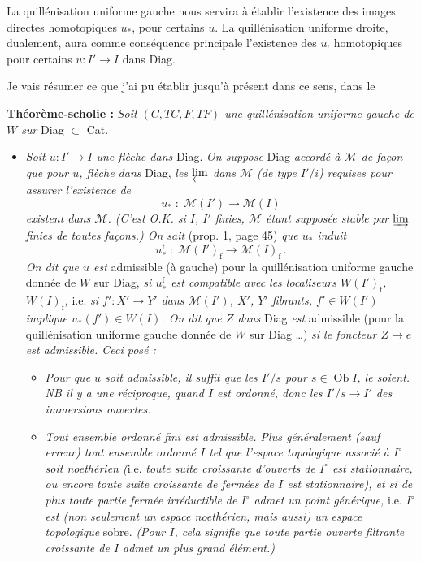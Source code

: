 \documentclass[11pt]{article}
\newcommand{\msp}[1]{\marginpar{\footnotesize [#1]}}
\begin{document}
La quillénisation uniforme gauche nous servira à établir l'existence des images directes homotopiques $u_{*}$, pour certains $u$. La quillénisation uniforme droite, dualement, aura comme conséquence principale l'existence des $u_{!}$ homotopiques pour certains $u : I' \longrightarrow I$ dans Diag.

Je vais résumer ce que j'ai pu établir jusqu'à présent dans ce sens, dans le

\msp{page 59}\textbf{Théorème-scholie :} \textit{Soit $(C,TC,F,TF)$ une quillénisation uniforme gauche de $W$ sur} Diag $\subset$ Cat.

\begin{itemize}[leftmargin=3em]
\item[1)] \textit{Soit $u : I' \longrightarrow I$ une flèche dans} Diag. \textit{On suppose} Diag \textit{accordé à $\mathcal{M}$ de façon que pour $u$, flèche dans} Diag, \textit{les $\varprojlim$ dans $\mathcal{M}$ (de type $I'/i$) requises pour assurer l'existence de}
\[ u_{*} \;:\; \mathcal{M}(I') \longrightarrow \mathcal{M}(I) \]
\textit{existent dans $\mathcal{M}$. (C'est O.K. si $I$, $I'$} \textit{finies, $\mathcal{M}$ étant supposée stable par $\varinjlim$ finies de toutes façons.) On sait} (prop. 1, page 45) \textit{que $u_{*}$ induit}
\[ u_{*}^{\mathrm{f}} \;:\; \mathcal{M}(I')_{\mathrm{f}} \longrightarrow \mathcal{M}(I)_{\mathrm{f}}\,. \tag*{$(*)$} \]
\textit{On dit que $u$ est} admissible (à gauche) pour la quillénisation uniforme gauche donnée de $W$ sur Diag, \textit{si $u_{*}^{\mathrm{f}}$ est compatible avec les localiseurs $W(I')_{\mathrm{f}}$, $W(I)_{\mathrm{f}}$,} i.e. \textit{si $f' : X' \longrightarrow Y'$ dans $\mathcal{M}(I')$, $X'$, $Y'$ fibrants, $f' \in W(I')$ implique $u_{*}(f') \in W(I)$. On dit que $Z$ dans} Diag \textit{est} admissible (pour la quillénisation uniforme gauche donnée de $W$ sur Diag \dots) \textit{si le foncteur $Z \longrightarrow e$ est admissible. Ceci posé :}
\begin{itemize}[leftmargin=2.5em]
\item[a)] \textit{Pour que $u$ soit admissible, il suffit que les $I'/s$ pour $s \in \operatorname{Ob} I$, le soient. NB il y a une réciproque, quand $I$ est ordonné, donc les $I'/s \longrightarrow I'$ des immersions ouvertes.}
\item[b)] \msp{page 60}\textit{Tout ensemble ordonné fini est admissible. Plus généralement (sauf erreur) tout ensemble ordonné $I$ tel que l'espace topologique associé à $I^{\circ}$ soit noethérien (}i.e. \textit{toute suite croissante d'ouverts de $I^{\circ}$ est stationnaire, ou encore toute suite croissante de fermées de $I$ est stationnaire), et si de plus toute partie fermée irréductible de $I^{\circ}$ admet un point générique,} i.e. \textit{$I^{\circ}$ est (non seulement un espace noethérien, mais aussi) un espace topologique} sobre. \textit{(Pour $I$, cela signifie que toute partie ouverte filtrante croissante de $I$ admet un plus grand élément.)} %
\end{itemize}
\end{itemize}
\end{document}
